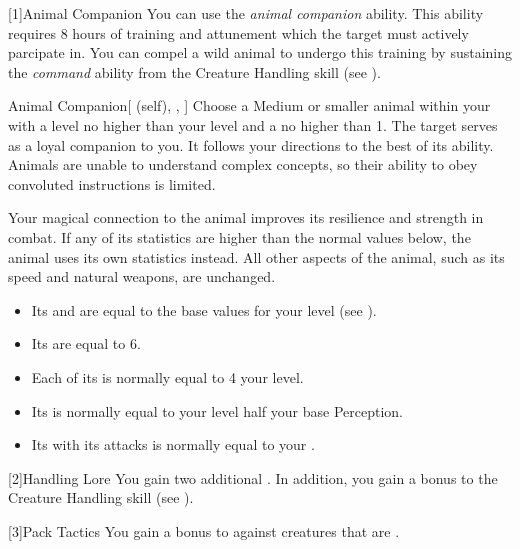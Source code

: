         [1]{Animal Companion}
        You can use the \textit{animal companion} ability.
        This ability requires 8 hours of training and attunement which the target must actively parcipate in.
        You can compel a wild animal to undergo this training by sustaining the \textit{command} ability from the Creature Handling skill (see ).
        \begin{attuneability}{Animal Companion}[ (self), , ]
            Choose a Medium or smaller animal  within your  with a level no higher than your level and a  no higher than 1.
            The target serves as a loyal companion to you.
            It follows your directions to the best of its ability.
            Animals are unable to understand complex concepts, so their ability to obey convoluted instructions is limited.

            Your magical connection to the animal improves its resilience and strength in combat.
            If any of its statistics are higher than the normal values below, the animal uses its own statistics instead.
            All other aspects of the animal, such as its speed and natural weapons, are unchanged.
            \begin{itemize}
                \item Its  and  are equal to the base values for your level (see ).
                \item Its  are equal to 6.
                \item Each of its  is normally equal to 4 \add your level.
                \item Its  is normally equal to your level \add half your base Perception.
                \item Its  with its attacks is normally equal to your  .
            \end{itemize}
        \end{attuneability}

        [2]{Handling Lore} You gain two additional .
        In addition, you gain a  bonus to the Creature Handling skill (see ).

        [3]{Pack Tactics} You gain a  bonus to  against creatures that are .

